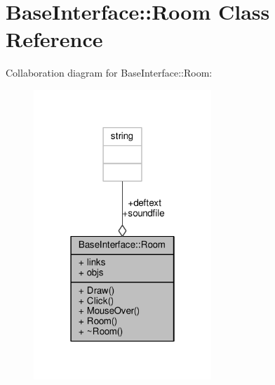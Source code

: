 \hypertarget{classBaseInterface_1_1Room}{}\section{Base\+Interface\+:\+:Room Class Reference}
\label{classBaseInterface_1_1Room}


Collaboration diagram for Base\+Interface\+:\+:Room\+:
\nopagebreak
\begin{figure}[H]
\begin{center}
\leavevmode
\includegraphics[width=190pt]{dc/d88/classBaseInterface_1_1Room__coll__graph}
\end{center}
\end{figure}
